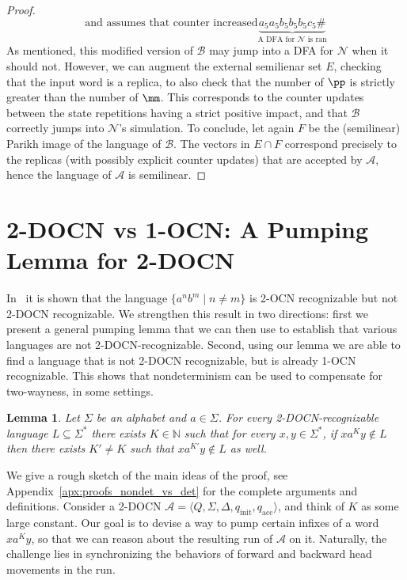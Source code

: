 \documentclass[11pt,a4paper]{amsart}
\newtheorem{lemma}[theorem]{Lemma}
\theoremstyle{definition}
\newcommand{\tup}[1]{\langle #1 \rangle}
\newcommand{\initstate}{q_{\mathrm{init}}}
\newcommand{\accstate}{q_{\mathrm{acc}}}
\newcommand{\bbN}{\mathbb{N}}
\newcommand{\cA}{\mathcal{A}}
\newcommand{\cB}{\mathcal{B}}
\newcommand{\cN}{\mathcal{N}}
\begin{document}
\begin{proof}
\[{		\text{and assumes that counter increased}}
	\underbrace{a_5a_5b_5b_5b_5c_5 \#}_{\text{A DFA for $\cN$ is ran}}\]
	As mentioned, this modified version of \(\cB\) may jump into a DFA for \(\cN\)
	when it should not.  However, we can augment the external semilienar set \(E\), checking that the input word is a replica, to also check that %
	the number of \(\pp\) is strictly greater than the number of \(\mm\).  This
	corresponds to the counter updates between the state repetitions having a
	strict positive impact, and that \(\cB\) correctly jumps into \(\cN\)'s
	simulation.  
	To conclude, let again \(F\) be the (semilinear) Parikh image of
	the language of \(\cB\).  The vectors in \(E \cap F\) correspond precisely to the
	replicas (with possibly explicit counter updates) that are accepted by \(\cA\),
	hence the language of \(\cA\) is semilinear.
\end{proof}

\section{2-DOCN  vs 1-OCN: A Pumping Lemma for  2-DOCN}
\label{sec:nondet_vs_det}
In~\cite{chan1987two} it is shown that the language $\{a^nb^m\mid n\neq m\}$ is 2-OCN
recognizable but not 2-DOCN recognizable. We strengthen this result in two
directions: first we present a general pumping lemma that we can then use to
establish that various languages are not 2-DOCN-recognizable. Second, using our
lemma we are able to find a language that is not 2-DOCN recognizable, but is
already 1-OCN recognizable. This shows that nondeterminism can be used to
compensate for two-wayness, in some settings.
\begin{lemma}\label{lem:2DOCN_pump}
	Let $\Sigma$ be an alphabet and $a\in \Sigma$. For every 2-DOCN-recognizable language
	\(L\subseteq \Sigma^*\) there exists \(K \in \bbN\) such that for every $x,y\in \Sigma^*$, if \(xa^Ky \notin
	L\) then there exists $K'\neq K$ such that \(xa^{K'}y \notin L\) as well.
\end{lemma} 
We give a rough sketch of the main ideas of the proof, see Appendix~\ref{apx:proofs_nondet_vs_det} for the complete arguments and definitions.
%
Consider a 2-DOCN $\cA=\tup{Q,\Sigma,\Delta,\initstate,\accstate}$, and think of $K$ as some large constant.
Our goal is to devise a way to pump certain infixes of a word $xa^Ky$, so that we can reason about the resulting run of $\cA$ on it. 
Naturally, the challenge lies in synchronizing the behaviors of forward and backward head movements in the run.
\end{document}
